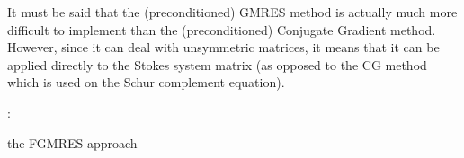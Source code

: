 It must be said that the (preconditioned) GMRES method is actually much more difficult to implement 
than the (preconditioned) Conjugate Gradient method.
However, since it can deal with unsymmetric matrices, it means that it can be applied 
directly to the Stokes system matrix (as opposed to the CG method which is used on the Schur complement
equation).

 

\Literature: \cite[p208]{eijkhout} \cite{saad,saad93} \cite{babc94} \cite{ayac03}







 










the FGMRES approach \cite{deit13}

\Literature \cite{pasa75,mamo08,fumt11,knke04,kool00,kopo93} 

